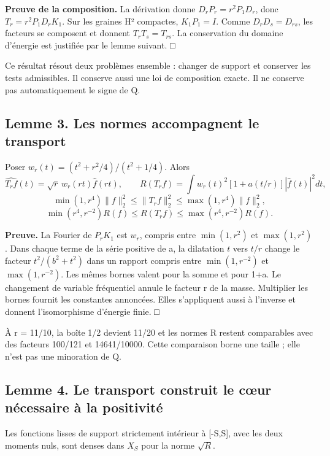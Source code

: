 \documentclass[
  10pt,
  a4paper,
]{article}
\begin{document}
\textbf{Preuve de la composition.} La dérivation donne
\(D_rP_r=r^2P_1D_r\), donc \(T_r=r^2P_1D_rK_1\). Sur les graines H²
compactes, \(K_1P_1=I\). Comme \(D_rD_s=D_{rs}\), les facteurs se
composent et donnent \(T_rT_s=T_{rs}\). La conservation du domaine
d'énergie est justifiée par le lemme suivant. □

Ce résultat résout deux problèmes ensemble : changer de support et
conserver les tests admissibles. Il conserve aussi une loi de
composition exacte. Il ne conserve pas automatiquement le signe de Q.

\hypertarget{lemme-3.-les-normes-accompagnent-le-transport}{%
\subsection{Lemme 3. Les normes accompagnent le
transport}\label{lemme-3.-les-normes-accompagnent-le-transport}}

Poser \(w_r(t)=(t^2+r^2/4)/(t^2+1/4)\). Alors \[
\widehat{T_rf}(t)=\sqrt r\,w_r(rt)\widehat f(rt),\qquad
R(T_rf)=\int w_r(t)^2[1+a(t/r)]|\widehat f(t)|^2dt,
\] \[
\min(1,r^4)\|f\|_2^2\le\|T_rf\|_2^2\le\max(1,r^4)\|f\|_2^2,
\] \[
\boxed{\min(r^4,r^{-2})R(f)\le R(T_rf)\le\max(r^4,r^{-2})R(f).}
\]

\textbf{Preuve.} La Fourier de \(P_rK_1\) est \(w_r\), compris entre
\(\min(1,r^2)\) et \(\max(1,r^2)\). Dans chaque terme de la série
positive de a, la dilatation \(t\) vers \(t/r\) change le facteur
\(t^2/(b^2+t^2)\) dans un rapport compris entre \(\min(1,r^{-2})\) et
\(\max(1,r^{-2})\). Les mêmes bornes valent pour la somme et pour 1+a.
Le changement de variable fréquentiel annule le facteur r de la masse.
Multiplier les bornes fournit les constantes annoncées. Elles
s'appliquent aussi à l'inverse et donnent l'isomorphisme d'énergie
finie. □

À r = 11/10, la boîte 1/2 devient 11/20 et les normes R restent
comparables avec des facteurs 100/121 et 14641/10000. Cette comparaison
borne une taille ; elle n'est pas une minoration de Q.

\hypertarget{lemme-4.-le-transport-construit-le-cux153ur-nuxe9cessaire-uxe0-la-positivituxe9}{%
\subsection{Lemme 4. Le transport construit le cœur nécessaire à la
positivité}\label{lemme-4.-le-transport-construit-le-cux153ur-nuxe9cessaire-uxe0-la-positivituxe9}}

Les fonctions lisses de support strictement intérieur à {[}-S,S{]}, avec
les deux moments nuls, sont denses dans \(X_S\) pour la norme
\(\sqrt R\).
\end{document}
